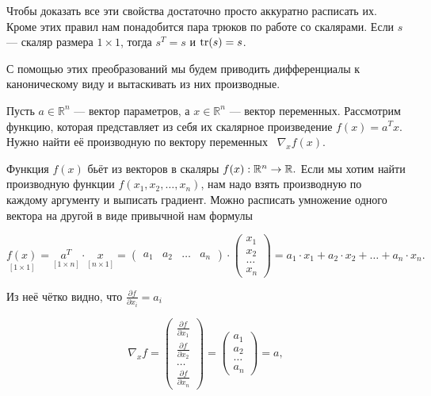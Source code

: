 \documentclass[12pt,fleqn]{article}
\begin{document}
Чтобы доказать все эти свойства достаточно просто аккуратно расписать их. Кроме этих правил нам понадобится пара трюков по работе со скалярами. Если $s$ --- скаляр размера $1 \times 1$, тогда $s^T = s$ и $\mathop{\mathrm{tr}}(s) = s$. 

С помощью этих преобразований мы будем приводить дифференциалы к каноническому виду и вытаскивать из них производные.


\begin{vkProblem}Пусть $a \in \mathbb{R}^n$ --- вектор параметров, а $x \in \mathbb{R}^n$ --- вектор переменных. Рассмотрим функцию, которая представляет из себя их скалярное произведение $f(x) = a^T x$. Нужно найти её производную по вектору переменных ~$\nabla_x f(x)$. 
\end{vkProblem}

\begin{esSolution}
Функция $f(x)$ бьёт из векторов в скаляры $f(x) : \mathbb{R}^n \to \mathbb{R}.$ Если мы хотим найти производную функции $f(x_1, x_2, \ldots, x_n)$, нам надо взять производную по каждому аргументу и выписать градиент. Можно расписать умножение одного вектора на другой в виде привычной нам формулы

\begin{equation*}
\underset{[1 \times 1]}{f(x)} = \underset{[1 \times n]}{a^T} \cdot \underset{[n \times 1]}{x} = \begin{pmatrix} a_1 & a_2 & \ldots &a_n \end{pmatrix} \cdot \begin{pmatrix} x_1 \\ x_2 \\ \ldots  \\ x_n \end{pmatrix} = a_1 \cdot x_1 + a_2 \cdot x_2 + \ldots + a_n \cdot x_n.
\end{equation*} 

Из неё чётко видно, что $\frac{\partial f}{\partial x_i} = a_i$

\[
\nabla_x f = \begin{pmatrix} \frac{\partial f}{\partial x_1} \\ \frac{\partial f}{\partial x_2} \\ \ldots  \\ \frac{\partial f}{\partial x_n} \end{pmatrix} = \begin{pmatrix} a_1 \\ a_2 \\ \ldots  \\ a_n \end{pmatrix} = a,
\]


\end{esSolution}
\end{document}
